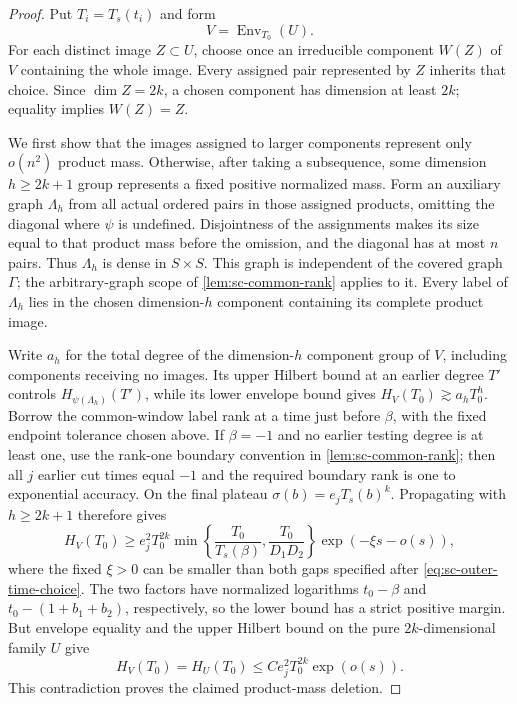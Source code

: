 \begin{proof}
Put $T_i=T_s(t_i)$ and form
\[
 V=\operatorname{Env}_{T_0}(U).
\]
For each distinct image $Z\subset U$, choose once an irreducible component $W(Z)$ of $V$ containing the whole image.  Every assigned pair represented by $Z$ inherits that choice.  Since $\dim Z=2k$, a chosen component has dimension at least $2k$; equality implies $W(Z)=Z$.

We first show that the images assigned to larger components represent only $o(n^2)$ product mass.  Otherwise, after taking a subsequence, some dimension $h\ge2k+1$ group represents a fixed positive normalized mass. Form an auxiliary graph $\Lambda_h$ from all actual ordered pairs in those assigned products, omitting the diagonal where $\psi$ is undefined. Disjointness of the assignments makes its size equal to that product mass before the omission, and the diagonal has at most $n$ pairs. Thus $\Lambda_h$ is dense in $S\times S$.  This graph is independent of the covered graph $\Gamma$; the arbitrary-graph scope of \cref{lem:sc-common-rank} applies to it. Every label of $\Lambda_h$ lies in the chosen dimension-$h$ component containing its complete product image.

Write $a_h$ for the total degree of the dimension-$h$ component group of $V$, including components receiving no images.  Its upper Hilbert bound at an earlier degree $T'$ controls $H_{\psi(\Lambda_h)}(T')$, while its lower envelope bound gives $H_V(T_0)\gtrsim a_hT_0^h$.  Borrow the common-window label rank at a time just before $\beta$, with the fixed endpoint tolerance chosen above.  If $\beta=-1$ and no earlier testing degree is at least one, use the rank-one boundary convention in \cref{lem:sc-common-rank}; then all $j$ earlier cut times equal $-1$ and the required boundary rank is one to exponential accuracy. On the final plateau $\sigma(b)=e_jT_s(b)^k$.  Propagating with $h\ge2k+1$ therefore gives
\[
 H_V(T_0)\ge e_j^2T_0^{2k}
 \min\left\{\frac{T_0}{T_s(\beta)},
             \frac{T_0}{D_1D_2}\right\}
       \exp(-\xi s-o(s)),
\]
where the fixed $\xi>0$ can be smaller than both gaps specified after \eqref{eq:sc-outer-time-choice}.  The two factors have normalized logarithms $t_0-\beta$ and $t_0-(1+b_1+b_2)$, respectively, so the lower bound has a strict positive margin.  But envelope equality and the upper Hilbert bound on the pure $2k$-dimensional family $U$ give
\[
 H_V(T_0)=H_U(T_0)\le C e_j^2T_0^{2k}\exp(o(s)).
\]
This contradiction proves the claimed product-mass deletion.


\end{proof}

